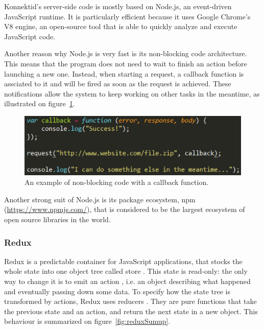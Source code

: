 Konnektid's server-side code is mostly based on Node.js, an event-driven JavaScript runtime. It is particularly efficient because it uses Google Chrome's V8 engine, an open-source tool that is able to quickly analyze and execute JavaScript code.

Another reason why Node.js is very fast is its non-blocking code architecture. This means that the program does not need to wait to finish an action before launching a new one. Instead, when starting a request, a callback function is assciated to it and will be fired as soon as the request is achieved. These notifications allow the system to keep working on other tasks in the meantime, as illustrated on {\sc figure}~\ref{fig:callback}.

\begin{figure}[H]
    \centering
    \includegraphics[scale=0.8]{figure/callback.png}
    \caption{An example of non-blocking code with a callback function.}
    \label{fig:callback}
\end{figure}

Another strong suit of Node.js is its package ecosystem, npm (\url{https://www.npmjs.com/}), that is considered to be the largest ecosystem of open source libraries in the world.

\subsubsection{Redux}
\label{sssec:redux}

Redux is a predictable container for JavaScript applications, that stocks the whole state into one object tree called \guillemotleft{} store \guillemotright{}. This state is read-only: the only way to change it is to emit an \guillemotleft{} action \guillemotright{}, i.e. an object describing what happened and eventually passing down some data. To specify how the state tree is transformed by actions, Redux uses \guillemotleft{} reducers \guillemotright{}. They are pure functions that take the previous state and an action, and return the next state in a new object. This behaviour is summarized on {\sc figure}~\ref{fig:reduxSumup}.


